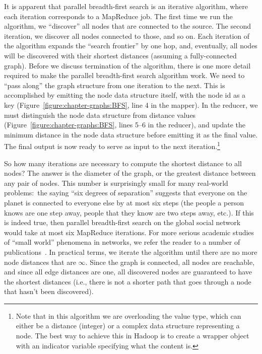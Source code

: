 It is apparent that parallel breadth-first search is an iterative
algorithm, where each iteration corresponds to a MapReduce job.  The
first time we run the algorithm, we ``discover'' all nodes that are
connected to the source.  The second iteration, we discover all nodes
connected to those, and so on.  Each iteration of the algorithm
expands the ``search frontier'' by one hop, and, eventually, all nodes
will be discovered with their shortest distances (assuming a
fully-connected graph).  Before we discuss termination of the
algorithm, there is one more detail required to make the parallel
breadth-first search algorithm work.  We need to ``pass along'' the
graph structure from one iteration to the next.  This is accomplished
by emitting the node data structure itself, with the node id as a key
(Figure~\ref{figure:chapter-graphs:BFS}, line 4 in the mapper).  In the
reducer, we must distinguish the node data structure from distance
values (Figure~\ref{figure:chapter-graphs:BFS}, lines 5--6 in the reducer),
and update the minimum distance in the node data structure before
emitting it as the final value.  The final output is now ready to
serve as input to the next iteration.\footnote{Note that in this
  algorithm we are overloading the value type, which can either be a
  distance (integer) or a complex data structure representing a node.
  The best way to achieve this in Hadoop is to create a wrapper object
  with an indicator variable specifying what the content is.}

So how many iterations are necessary to compute the shortest distance
to all nodes?  The answer is the diameter of the graph, or the
greatest distance between any pair of nodes.  This number is
surprisingly small for many real-world problems:\ the saying ``six
degrees of separation'' suggests that everyone on the planet is
connected to everyone else by at most six steps (the people a person
knows are one step away, people that they know are two steps away,
etc.).  If this is indeed true, then parallel breadth-first search on
the global social network would take at most six MapReduce iterations.
For more serious academic studies of ``small world'' phenomena in
networks, we refer the reader to a number of
publications~\cite{Granovetter73,Granovetter83,Watts_Strogatz_1998,Albert_Barabasi_2002}.
In practical terms, we iterate the algorithm until there are no more
node distances that are $\infty$.  Since the graph is connected, all
nodes are reachable, and since all edge distances are one, all
discovered nodes are guaranteed to have the shortest distances (i.e.,
there is not a shorter path that goes through a node that hasn't been
discovered).

